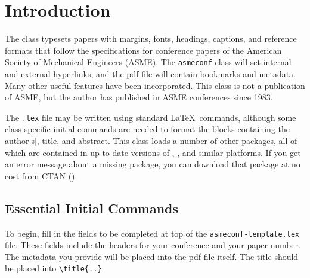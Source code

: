\documentclass[colorlinks,upint,subscriptcorrection,varvw,hyphenate,balance,greek,russian,vietnamese,german]{asmeconf} %
\begin{document}
\begin{nomenclature}



\end{nomenclature}


\section{Introduction}
The \texttt{} class typesets papers with margins, fonts, headings, captions, and reference formats that follow the specifications for conference papers of the American Society of Mechanical Engineers (ASME). The \texttt{asmeconf} class will set internal and external hyperlinks, and the pdf file will contain bookmarks and metadata. Many other useful features have been incorporated. This class is not a publication of ASME, but the author has published in ASME conferences since 1983. 

The \texttt{.tex} file may be written using standard \LaTeX\ commands, although some class-specific initial commands are needed to format the blocks containing the author[s], title, and abstract.  This class loads a number of other packages, all of which are contained in up-to-date versions of , , and similar platforms. If you get an error message about a missing package, you can download that package at no cost from CTAN (). 

\subsection{Essential Initial Commands}

To begin, fill in the fields to be completed at top of the \texttt{asmeconf-template.tex} file. These fields include the headers for your conference and your paper number. The metadata you provide will be placed into the pdf file itself. 
The title should be placed into \verb|\title{..}|. 
\end{document}
